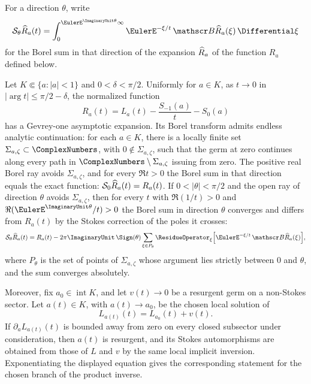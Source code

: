 For a direction \(\theta\), write
\[
 \mathcal S_\theta\FormalGevreySeriesSymbol{R}_a(t)
  =\int_0^{\EulerE^{\ImaginaryUnit\theta}\infty}
     \EulerE^{-\xi/t}\,
     \mathscr B\FormalGevreySeriesSymbol{R}_a(\xi)\,\Differential\xi
\]
for the Borel sum in that direction of the expansion
\(\widehat{R}_a\) of the function \(R_a\) defined below.

\begin{conjecture}
\label{conj:cyclotomic-resurgent-inverse}
Let \(K\Subset\{a:\lvert a\rvert<1\}\) and
\(0<\delta<\pi/2\).  Uniformly for \(a\in K\), as \(t\to0\) in
\(\lvert\arg t\rvert\le\pi/2-\delta\), the normalized function
\[
 R_a(t)=L_a(t)-\frac{S_{-1}(a)}{t}-S_0(a)
\]
has a Gevrey-one asymptotic expansion.  Its Borel transform admits endless
analytic continuation: for each \(a\in K\), there is a locally finite set
\(\Sigma_{a,\zeta}\subset\ComplexNumbers\), with \(0\notin\Sigma_{a,\zeta}\), such that the
germ at zero continues along every path in
\(\ComplexNumbers\setminus\Sigma_{a,\zeta}\) issuing from zero.  The positive
real Borel ray avoids \(\Sigma_{a,\zeta}\), and for every \(\Re t>0\) the Borel
sum in that direction equals the exact function:
\(\mathcal S_0\widehat{R}_a(t)=R_a(t)\).  If
\(0<\lvert\theta\rvert<\pi/2\) and the open ray of direction \(\theta\) avoids
\(\Sigma_{a,\zeta}\), then for every \(t\) with \(\Re(1/t)>0\) and
\(\Re(\EulerE^{\ImaginaryUnit\theta}/t)>0\) the Borel sum in direction
\(\theta\) converges and differs from \(R_a(t)\) by the Stokes correction of the
poles it crosses:
\[
 \mathcal S_\theta\FormalGevreySeriesSymbol{R}_a(t)
  =R_a(t)-2\pi\ImaginaryUnit\,\Sign(\theta)
   \sum_{\xi\in P_\theta}
   \ResidueOperator_{\xi}\Bigl[\EulerE^{-\xi/t}\,
     \mathscr B\FormalGevreySeriesSymbol{R}_a(\xi)\Bigr],
\]
where \(P_\theta\) is the set of points of \(\Sigma_{a,\zeta}\) whose argument
lies strictly between \(0\) and \(\theta\), and the sum converges absolutely.

Moreover, fix \(a_0\in\operatorname{int}K\), and let \(v(t)\to0\) be a
resurgent germ on a non-Stokes sector.  Let \(a(t)\in K\), with
\(a(t)\to a_0\), be the chosen local solution of
\[
 L_{a(t)}(t)=L_{a_0}(t)+v(t).
\]
If \(\partial_aL_{a(t)}(t)\) is bounded away from zero on every closed
subsector under consideration, then \(a(t)\) is resurgent, and its Stokes
automorphisms are obtained from those of \(L\) and \(v\) by the same local
implicit inversion.  Exponentiating the displayed equation gives the
corresponding statement for the chosen branch of the product inverse.
\end{conjecture}

